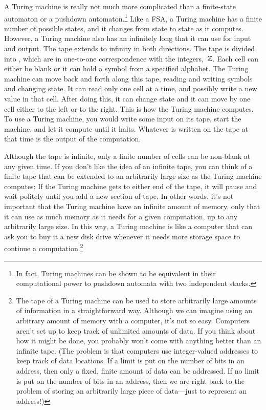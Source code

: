 A Turing machine is really not much more complicated than a finite-state 
automaton or a pushdown automaton.\footnote{In fact, Turing machines can
be shown to be equivalent in their computational power
to pushdown automata with two independent stacks.}
Like a FSA, a Turing machine has a finite number of 
possible states, and it changes from state to state as it computes.
However, a Turing machine also has an infinitely long 
that it can use for input and output.  The tape extends to infinity in
both directions.  The tape is divided into , which
are in one-to-one correspondence with the
integers,~${\mathbb Z}$. Each cell can either be blank or it can hold a symbol from
a specified alphabet.  The Turing machine can move back and forth
along this tape, reading and writing symbols and changing state.
It can read only one cell at a time, and possibly write a new
value in that cell.  After doing this, it can change state and
it can move by one cell either to the left or to the right.
This is how the Turing machine computes.  To use a Turing machine,
you would write some input on its tape, start the machine, and let
it compute until it halts.  Whatever is written on the tape at that
time is the output of the computation.

Although the tape is infinite, only a finite number
of cells can be non-blank at any given time.  
If you don't like the idea
of an infinite tape, you can think of a finite tape that can be
extended to an arbitrarily large size as the Turing machine computes:
If the Turing machine gets to either end of the tape, it will pause and
wait politely until you add a new section of tape.  In other words,
it's not important that the Turing machine have an infinite amount of
memory, only that it can use as much memory as it needs for a given
computation, up to any arbitrarily large size.   In this way, a Turing
machine is like a computer that can ask you to buy it a new disk drive
whenever it needs more storage space to continue a computation.\footnote{The
tape of a Turing machine can be used to store arbitrarily large amounts of
information in a straightforward way.  Although we can imagine using
an arbitrary amount of memory with a computer, it's not so easy.  Computers
aren't set up to keep track of unlimited amounts of data.  If you think 
about how it might be done, you probably won't come with anything better
than an infinite tape. (The problem is that computers use integer-valued
addresses to keep track of data locations.  If a limit is put on
the number of bits in an address, then only a fixed, finite amount
of data can be addressed.  If no limit is put on the number of bits
in an address, then we are right back to the problem of storing an
arbitrarily large piece of data---just to represent an address!)}

